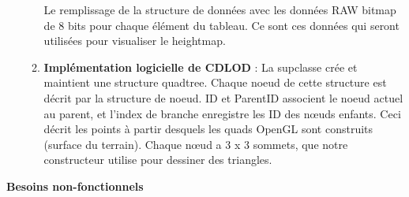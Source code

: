 \documentclass[12pt]{report}
\begin{document}
\begin{enumerate}
\begin{enumerate}
        Le remplissage de la structure de données avec les données RAW bitmap de 8 bits pour chaque élément du tableau. Ce sont ces données qui seront utilisées pour visualiser le heightmap.
        \item \textbf{Implémentation logicielle de CDLOD} :
        La supclasse crée et maintient une structure quadtree. Chaque noeud de cette structure est décrit par la structure de noeud. ID et ParentID associent le noeud actuel au parent, et l'index de branche enregistre les ID des nœuds enfants. Ceci décrit les points à partir desquels les quads OpenGL sont construits (surface du terrain). Chaque nœud a 3 x 3 sommets, que notre constructeur utilise pour dessiner des triangles.
    \end{enumerate}
\end{enumerate}

\vspace{0.3cm}

\textbf{Besoins non-fonctionnels}
\end{document}
